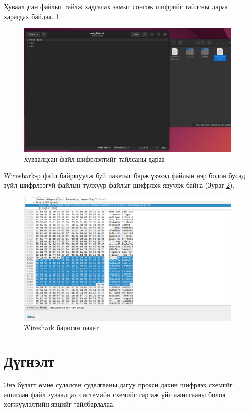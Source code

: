 Хуваалцсан файлыг тайлж хадгалах замыг сонгож шифрийг тайлсны дараа харагдах байдал. \ref{fig:result_decrypt}
\begin{figure}[H]
    \centering
    \includegraphics[scale=0.3]{Figures/example/shared_file_example.png}
    \caption{Хуваалцсан файл шифрлэлтийг тайлсаны дараа}
    \label{fig:result_decrypt}
\end{figure}

Wireshark-р файл байршуулж буй пакетыг барж үзэхэд файлын нэр болон бусад зүйл шифрлээгүй файлын түлхүүр файлыг шифрлэж явуулж байна (Зураг \ref{fig:wireshark_result}).
\begin{figure}[H]
    \centering
    \includegraphics[scale=0.3]{Figures/example/wireshark_result.png}
    \caption{Wireshark барисан пакет}
    \label{fig:wireshark_result}
\end{figure}

\section{Дүгнэлт}
Энэ бүлэгт өмнө судалсан судалгааны дагуу прокси дахин шифрлэх схемийг ашиглан файл хуваалцах системийн схемийг гаргаж үйл ажилгааны болон хөгжүүлэлтийн явцийг тайлбарлалаа.
